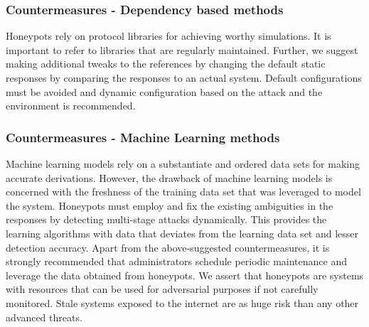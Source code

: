 \subsubsection{Countermeasures - Dependency based methods}
Honeypots rely on protocol libraries for achieving worthy simulations. It is important to refer to libraries that are regularly maintained. Further, we suggest making additional tweaks to the references by changing the default static responses by comparing the responses to an actual system. Default configurations must be avoided and dynamic configuration based on the attack and the environment is recommended. 

\subsubsection{Countermeasures - Machine Learning methods}
Machine learning models rely on a substantiate and ordered data sets for making accurate derivations. However, the drawback of machine learning models is concerned with the freshness of the training data set that was leveraged to model the system. Honeypots must employ and fix the existing ambiguities in the responses by detecting multi-stage attacks dynamically. This provides the learning algorithms with data that deviates from the learning data set and lesser detection accuracy.
\newline
Apart from the above-suggested countermeasures, it is strongly recommended that administrators schedule periodic maintenance and leverage the data obtained from honeypots. We assert that honeypots are systems with resources that can be used for adversarial purposes if not carefully monitored. Stale systems exposed to the internet are as huge risk than any other advanced threats. 

